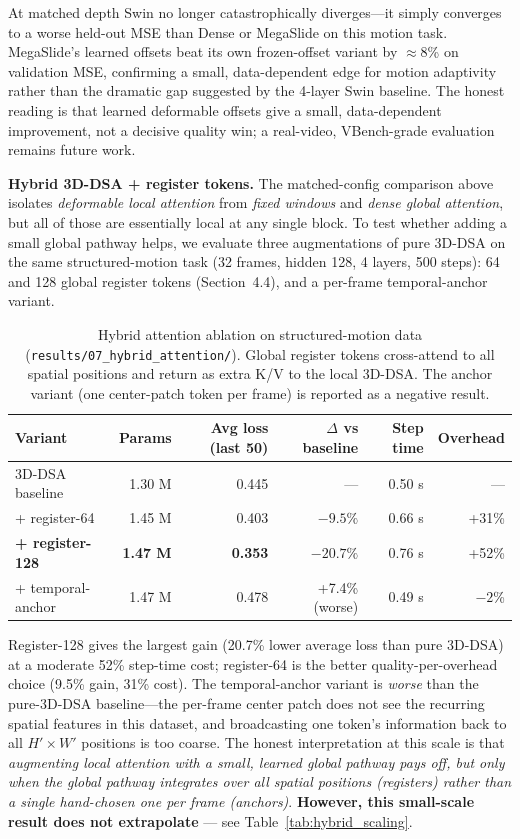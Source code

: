\documentclass[11pt, letterpaper]{article}
\begin{document}
At matched depth Swin no longer catastrophically diverges---it simply converges to a worse held-out MSE than Dense or MegaSlide on this motion task. MegaSlide's learned offsets beat its own frozen-offset variant by $\approx$8\% on validation MSE, confirming a small, data-dependent edge for motion adaptivity rather than the dramatic gap suggested by the 4-layer Swin baseline. The honest reading is that learned deformable offsets give a small, data-dependent improvement, not a decisive quality win; a real-video, VBench-grade evaluation remains future work.

\textbf{Hybrid 3D-DSA + register tokens.} The matched-config comparison above isolates \emph{deformable local attention} from \emph{fixed windows} and \emph{dense global attention}, but all of those are essentially local at any single block. To test whether adding a small global pathway helps, we evaluate three augmentations of pure 3D-DSA on the same structured-motion task (32 frames, hidden 128, 4 layers, 500 steps): 64 and 128 global register tokens (Section~4.4), and a per-frame temporal-anchor variant.

\begin{table}[h]
\centering
\begin{tabular}{lrrrrr}
\toprule
\textbf{Variant} & \textbf{Params} & \textbf{Avg loss (last 50)} & \textbf{$\Delta$ vs baseline} & \textbf{Step time} & \textbf{Overhead} \\
\midrule
3D-DSA baseline & 1.30 M & 0.445 & --- & 0.50 s & --- \\
+ register-64 & 1.45 M & 0.403 & $\mathbf{-9.5\%}$ & 0.66 s & +31\% \\
\textbf{+ register-128} & \textbf{1.47 M} & \textbf{0.353} & $\mathbf{-20.7\%}$ & 0.76 s & +52\% \\
+ temporal-anchor & 1.47 M & 0.478 & +7.4\% (worse) & 0.49 s & $-2$\% \\
\bottomrule
\end{tabular}
\caption{Hybrid attention ablation on structured-motion data (\texttt{results/07\_hybrid\_attention/}). Global register tokens cross-attend to all spatial positions and return as extra K/V to the local 3D-DSA. The anchor variant (one center-patch token per frame) is reported as a negative result.}
\label{tab:hybrid_attention}
\end{table}

Register-128 gives the largest gain (20.7\% lower average loss than pure 3D-DSA) at a moderate 52\% step-time cost; register-64 is the better quality-per-overhead choice (9.5\% gain, 31\% cost). The temporal-anchor variant is \emph{worse} than the pure-3D-DSA baseline---the per-frame center patch does not see the recurring spatial features in this dataset, and broadcasting one token's information back to all $H' \times W'$ positions is too coarse. The honest interpretation at this scale is that \emph{augmenting local attention with a small, learned global pathway pays off, but only when the global pathway integrates over all spatial positions (registers) rather than a single hand-chosen one per frame (anchors)}. \textbf{However, this small-scale result does not extrapolate} --- see Table~\ref{tab:hybrid_scaling}.
\end{document}
